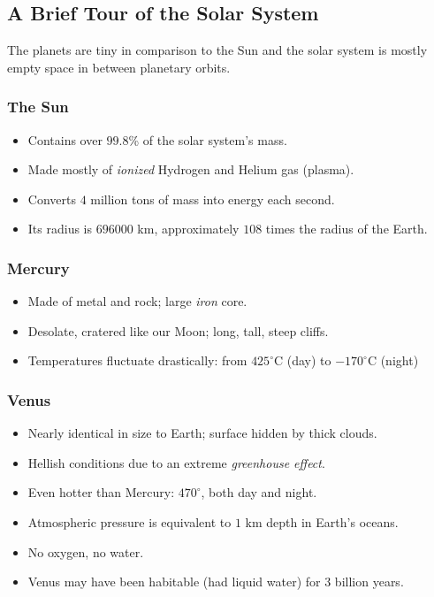 \documentclass[class=article, crop=false]{standalone}
\begin{document}
  \subsection{A Brief Tour of the Solar System}
  The planets are tiny in comparison to the Sun and the solar system is mostly empty space in between planetary orbits.
  \subsubsection{The Sun}
  \begin{itemize}
    \item Contains over $99.8$\% of the solar system's mass.
    \item Made mostly of \emph{ionized} Hydrogen and Helium gas (plasma).
    \item Converts $4$ million tons of mass into energy each second.
    \item Its radius is $696000$ km, approximately $108$ times the radius of the Earth.
  \end{itemize}
  \subsubsection{Mercury}
  \begin{itemize}
    \item Made of metal and rock; large \emph{iron} core.
    \item Desolate, cratered like our Moon; long, tall, steep cliffs.
    \item Temperatures fluctuate drastically: from $425^\circ$C (day) to $-170^\circ$C (night)
  \end{itemize}
  \subsubsection{Venus}
  \begin{itemize}
    \item Nearly identical in size to Earth; surface hidden by thick clouds.
    \item Hellish conditions due to an extreme \emph{greenhouse effect}.
    \item Even hotter than Mercury: $470^\circ$, both day and night.
    \item Atmospheric pressure is equivalent to $1$ km depth in Earth's oceans.
    \item No oxygen, no water.
    \item Venus may have been habitable (had liquid water) for $3$ billion years.
  \end{itemize}
\end{document}
